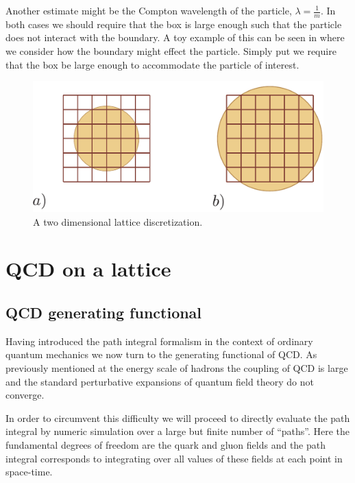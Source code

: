 Another estimate might be the Compton wavelength of the particle, $\lambda = \frac{1}{m}$. In both cases we should require that the box is large enough such that the particle does not interact with the boundary. A toy example of this can be seen in  where we consider how the boundary might effect the particle. Simply put we require that the box be large enough to accommodate the particle of interest. 


\begin{figure}[htbp]
\centering
\includegraphics[width=0.7\linewidth]{figures/2DLattice/2dLatticeCompton.pdf}
\caption{ A two dimensional lattice discretization. \label{fig::2DlatticeCompton}}
\end{figure}





\section{QCD on a lattice} \label{QCD::lattice} 



\subsection{QCD generating functional \label{QCD::generating_functional}}
Having introduced the path integral formalism in the context of ordinary quantum mechanics we now turn to the generating functional of QCD. As previously mentioned at the energy scale of hadrons the coupling of QCD is large and the standard perturbative expansions of quantum field theory do not converge.  

In order to circumvent this difficulty we will proceed to directly evaluate the path integral by numeric simulation over a large but finite number of ``paths''. Here the fundamental degrees of freedom are the quark and gluon fields and the path integral corresponds to integrating over all values of these fields at each point in space-time.

